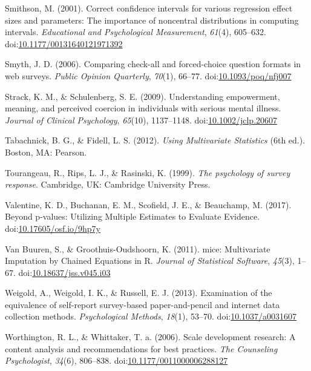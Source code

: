\documentclass[english,man, mask]{apa6}
\theoremstyle{definition}
\theoremstyle{definition}
\theoremstyle{definition}
\theoremstyle{remark}
\begin{document}
\hypertarget{ref-Smithson2001}{}
Smithson, M. (2001). Correct confidence intervals for various regression
effect sizes and parameters: The importance of noncentral distributions
in computing intervals. \emph{Educational and Psychological
Measurement}, \emph{61}(4), 605--632.
doi:\href{https://doi.org/10.1177/00131640121971392}{10.1177/00131640121971392}

\hypertarget{ref-Smyth2006}{}
Smyth, J. D. (2006). Comparing check-all and forced-choice question
formats in web surveys. \emph{Public Opinion Quarterly}, \emph{70}(1),
66--77.
doi:\href{https://doi.org/10.1093/poq/nfj007}{10.1093/poq/nfj007}

\hypertarget{ref-Strack2009}{}
Strack, K. M., \& Schulenberg, S. E. (2009). Understanding empowerment,
meaning, and perceived coercion in individuals with serious mental
illness. \emph{Journal of Clinical Psychology}, \emph{65}(10),
1137--1148.
doi:\href{https://doi.org/10.1002/jclp.20607}{10.1002/jclp.20607}

\hypertarget{ref-Tabachnick2012}{}
Tabachnick, B. G., \& Fidell, L. S. (2012). \emph{Using Multivariate
Statistics} (6th ed.). Boston, MA: Pearson.

\hypertarget{ref-Tourangeau1999}{}
Tourangeau, R., Rips, L. J., \& Rasinski, K. (1999). \emph{The
psychology of survey response}. Cambridge, UK: Cambridge University
Press.

\hypertarget{ref-Valentine2017}{}
Valentine, K. D., Buchanan, E. M., Scofield, J. E., \& Beauchamp, M.
(2017). Beyond p-values: Utilizing Multiple Estimates to Evaluate
Evidence.
doi:\href{https://doi.org/10.17605/osf.io/9hp7y}{10.17605/osf.io/9hp7y}

\hypertarget{ref-VanBuuren2011}{}
Van Buuren, S., \& Groothuis-Oudshoorn, K. (2011). mice: Multivariate
Imputation by Chained Equations in R. \emph{Journal of Statistical
Software}, \emph{45}(3), 1--67.
doi:\href{https://doi.org/10.18637/jss.v045.i03}{10.18637/jss.v045.i03}

\hypertarget{ref-Weigold2013}{}
Weigold, A., Weigold, I. K., \& Russell, E. J. (2013). Examination of
the equivalence of self-report survey-based paper-and-pencil and
internet data collection methods. \emph{Psychological Methods},
\emph{18}(1), 53--70.
doi:\href{https://doi.org/10.1037/a0031607}{10.1037/a0031607}

\hypertarget{ref-Worthington2006}{}
Worthington, R. L., \& Whittaker, T. a. (2006). Scale development
research: A content analysis and recommendations for best practices.
\emph{The Counseling Psychologist}, \emph{34}(6), 806--838.
doi:\href{https://doi.org/10.1177/0011000006288127}{10.1177/0011000006288127}
\end{document}
